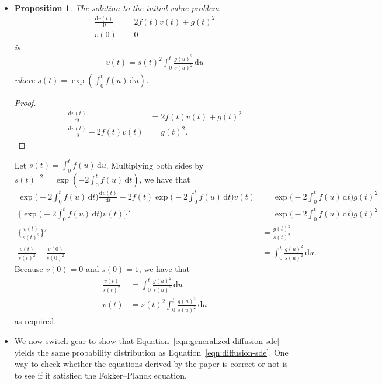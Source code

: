 \documentclass[10pt]{article}
\newtheorem{proposition}[lemma]{Proposition}
\newcommand{\dee}{\mathrm{d}}
\begin{document}
\begin{itemize}
  \item \begin{proposition} \label{thm:linear-sde-variance}
    The solution to the initial value problem 
    \begin{align*}
      \frac{\dee v(t)}{\dee t} &= 2f(t)v(t) + g(t)^2 \\
      v(0) &= 0      
    \end{align*}
    is
    \begin{align*}
      v(t) = s(t)^2 \int_0^t \frac{g(u)^2}{s(u)^2}\, \dee u
    \end{align*}
    where $s(t) = \exp(\int_0^t f(u)\, \dee u)$.
  \end{proposition}
  \begin{proof}
    \begin{align*}
    \frac{\dee v(t)}{\dee t} &= 2f(t)v(t) + g(t)^2 \\
    \frac{\dee v(t)}{\dee t} - 2f(t)v(t) &= g(t)^2.
    \end{align*}
  \end{proof}
  Let $s(t) = \int_0^t f(u)\, \dee u$.
  Multiplying both sides by $s(t)^{-2} = \exp(-2\int_0^t f(u)\, \dee t)$, we have that
  \begin{align*}
    \exp\bigg( -2 \int_0^t f(u)\, \dee t \bigg) \frac{\dee v(t)}{\dee t}
    - 2f(t) \exp\bigg( -2 \int_0^t f(u)\, \dee t \bigg) v(t)
    &= \exp\bigg( -2 \int_0^t f(u)\, \dee t \bigg) g(t)^2 \\
    \bigg\{ \exp\bigg( -2 \int_0^t f(u)\, \dee t \bigg) v(t) \bigg\}'
    &= \exp\bigg( -2 \int_0^t f(u)\, \dee t \bigg) g(t)^2 \\
    \bigg\{ \frac{v(t)}{s(t)^2} \bigg\}'
    &= \frac{g(t)^2}{s(t)^2} \\
    \frac{v(t)}{s(t)^2} - \frac{v(0)}{s(0)^2} &= \int_0^t \frac{g(u)^2}{s(u)^2}\, \dee u.
  \end{align*}
  Because $v(0) = 0$ and $s(0) = 1$, we have that
  \begin{align*}
    \frac{v(t)}{s(t)^2} &= \int_0^t \frac{g(u)^2}{s(u)^2}\, \dee u \\
    v(t) &= s(t)^2 \int_0^t \frac{g(u)^2}{s(u)^2}\, \dee u
  \end{align*}
  as required.

  \item We now switch gear to show that Equation~\eqref{eqn:generalized-diffusion-sde} yields the same probability distribution as Equation~\eqref{eqn:diffusion-sde}. One way to check whether the equations derived by the paper is correct or not is to see if it satisfied the Fokker--Planck equation.
  

\end{itemize}
\end{document}
